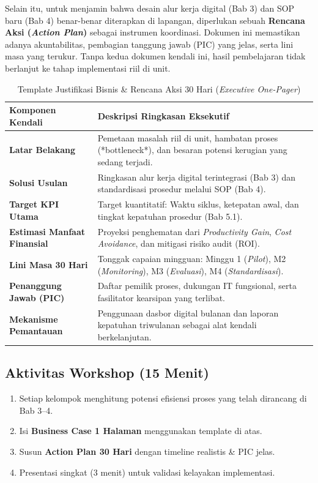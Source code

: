 \documentclass[12pt,a4paper]{report}
\begin{document}
Selain itu, untuk menjamin bahwa desain alur kerja digital (Bab 3) dan SOP baru (Bab 4) benar-benar diterapkan di lapangan, diperlukan sebuah \textbf{Rencana Aksi (\textit{Action Plan})} sebagai instrumen koordinasi. Dokumen ini memastikan adanya akuntabilitas, pembagian tanggung jawab (PIC) yang jelas, serta lini masa yang terukur. Tanpa kedua dokumen kendali ini, hasil pembelajaran tidak berlanjut ke tahap implementasi riil di unit.

\begin{table}[htbp]
\centering
\small
\caption{Template Justifikasi Bisnis \& Rencana Aksi 30 Hari (\textit{Executive One-Pager})}
\begin{tabularx}{\textwidth}{@{} >{\raggedright\arraybackslash}X >{\raggedright\arraybackslash}X @{}}
\toprule
\textbf{Komponen Kendali} & \textbf{Deskripsi Ringkasan Eksekutif} \\
\midrule
\textbf{Latar Belakang} & Pemetaan masalah riil di unit, hambatan proses (*bottleneck*), dan besaran potensi kerugian yang sedang terjadi. \\
\textbf{Solusi Usulan} & Ringkasan alur kerja digital terintegrasi (Bab 3) dan standardisasi prosedur melalui SOP (Bab 4). \\
\textbf{Target KPI Utama} & Target kuantitatif: Waktu siklus, ketepatan awal, dan tingkat kepatuhan prosedur (Bab 5.1). \\
\textbf{Estimasi Manfaat Finansial} & Proyeksi penghematan dari \textit{Productivity Gain}, \textit{Cost Avoidance}, dan mitigasi risiko audit (ROI). \\
\textbf{Lini Masa 30 Hari} & Tonggak capaian mingguan: Minggu 1 (\textit{Pilot}), M2 (\textit{Monitoring}), M3 (\textit{Evaluasi}), M4 (\textit{Standardisasi}). \\
\textbf{Penanggung Jawab (PIC)} & Daftar pemilik proses, dukungan IT fungsional, serta fasilitator kearsipan yang terlibat. \\
\textbf{Mekanisme Pemantauan} & Penggunaan dasbor digital bulanan dan laporan kepatuhan triwulanan sebagai alat kendali berkelanjutan. \\
\bottomrule
\end{tabularx}
\end{table}

\subsection*{Aktivitas Workshop (15 Menit)}
\begin{enumerate}[leftmargin=*]
    \item Setiap kelompok menghitung potensi efisiensi proses yang telah dirancang di Bab 3--4.
    \item Isi \textbf{Business Case 1 Halaman} menggunakan template di atas.
    \item Susun \textbf{Action Plan 30 Hari} dengan timeline realistis \& PIC jelas.
    \item Presentasi singkat (3 menit) untuk validasi kelayakan implementasi.
\end{enumerate}
\end{document}
